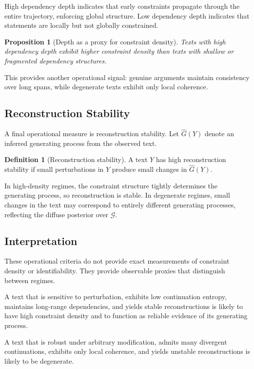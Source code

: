 \documentclass[12pt, oneside]{article}
\theoremstyle{plain}
\newtheorem{proposition}[theorem]{Proposition}
\theoremstyle{definition}
\newtheorem{definition}[theorem]{Definition}
\theoremstyle{remark}
\begin{document}
High dependency depth indicates that early constraints propagate through the
entire trajectory, enforcing global structure. Low dependency depth indicates
that statements are locally but not globally constrained.

\begin{proposition}[Depth as a proxy for constraint density]
Texts with high dependency depth exhibit higher constraint density than texts
with shallow or fragmented dependency structures.
\end{proposition}

This provides another operational signal: genuine arguments maintain consistency
over long spans, while degenerate texts exhibit only local coherence.

\subsection{Reconstruction Stability}

A final operational measure is reconstruction stability. Let $\hat{G}(Y)$ denote
an inferred generating process from the observed text.

\begin{definition}[Reconstruction stability]
A text $Y$ has high reconstruction stability if small perturbations in $Y$
produce small changes in $\hat{G}(Y)$.
\end{definition}

In high-density regimes, the constraint structure tightly determines the
generating process, so reconstruction is stable. In degenerate regimes,
small changes in the text may correspond to entirely different generating
processes, reflecting the diffuse posterior over $\mathcal{G}$.

\subsection{Interpretation}

These operational criteria do not provide exact measurements of constraint density
or identifiability. They provide observable proxies that distinguish between regimes.

A text that is sensitive to perturbation, exhibits low continuation entropy,
maintains long-range dependencies, and yields stable reconstructions is likely to
have high constraint density and to function as reliable evidence of its generating
process.

A text that is robust under arbitrary modification, admits many divergent
continuations, exhibits only local coherence, and yields unstable reconstructions
is likely to be degenerate.
\end{document}
